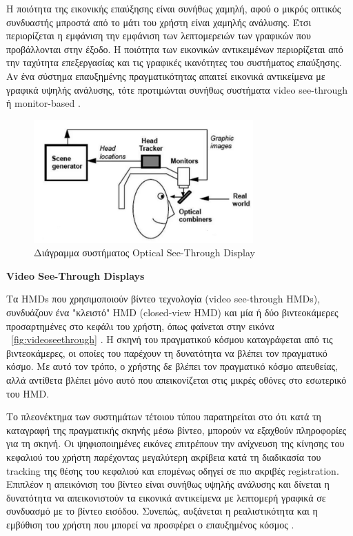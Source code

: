 H ποιότητα της εικονικής επαύξησης είναι συνήθως χαμηλή, αφού ο μικρός οπτικός συνδυαστής μπροστά από το μάτι του χρήστη είναι χαμηλής ανάλυσης. Έτσι περιορίζεται η εμφάνιση την εμφάνιση των λεπτομερειών των γραφικών που προβάλλονται στην έξοδο. Η ποιότητα των εικονικών αντικειμένων περιορίζεται από την ταχύτητα επεξεργασίας και τις γραφικές ικανότητες του συστήματος επαύξησης. Αν ένα σύστημα επαυξημένης πραγματικότητας απαιτεί εικονικά αντικείμενα με γραφικά υψηλής ανάλυσης, τότε προτιμώνται συνήθως συστήματα video see-through ή monitor-based \cite{Mcdonald2003} . 


\begin{figure}[H]
    \centering
    \includegraphics[width=0.75\textwidth]{Files/Figures/optical.jpg}
    \caption[Διάγραμμα συστήματος Optical See-Through Display]{ Διάγραμμα συστήματος Optical See-Through Display \cite{azuma1997}}
    \label{fig:opticalseethrough}
\end{figure}



\textbf{Video See-Through Displays}

Τα HMDs που χρησιμοποιούν βίντεο τεχνολογία (video see-through HMDs), συνδυάζουν ένα "κλειστό" HMD (closed-view HMD) και μία ή δύο βιντεοκάμερες προσαρτημένες στο κεφάλι του χρήστη, όπως φαίνεται στην εικόνα ~\ref{fig:videoseethrough} . Η σκηνή του πραγματικού κόσμου καταγράφεται από τις βιντεοκάμερες, οι οποίες του παρέχουν τη δυνατότητα να βλέπει τον πραγματικό κόσμο. Με αυτό τον τρόπο, ο χρήστης δε βλέπει τον πραγματικό κόσμο απευθείας, αλλά αντίθετα βλέπει μόνο αυτό που απεικονίζεται στις μικρές οθόνες στο εσωτερικό του HMD.  

 

Το πλεονέκτημα των συστημάτων τέτοιου τύπου παρατηρείται στο ότι κατά τη καταγραφή της πραγματικής σκηνής μέσω βίντεο, μπορούν να εξαχθούν πληροφορίες για τη σκηνή. Οι ψηφιοποιημένες εικόνες επιτρέπουν την ανίχνευση της κίνησης του κεφαλιού του χρήστη παρέχοντας μεγαλύτερη ακρίβεια κατά τη διαδικασία του tracking της θέσης του κεφαλιού και επομένως οδηγεί σε πιο ακριβές registration. Επιπλέον η απεικόνιση του βίντεο είναι συνήθως υψηλής ανάλυσης και δίνεται η δυνατότητα να απεικονιστούν τα εικονικά αντικείμενα με λεπτομερή γραφικά σε συνδυασμό με το βίντεο εισόδου. Συνεπώς, αυξάνεται η ρεαλιστικότητα και η εμβύθιση του χρήστη που μπορεί να προσφέρει ο επαυξημένος κόσμος \cite{krevelen2010} .


